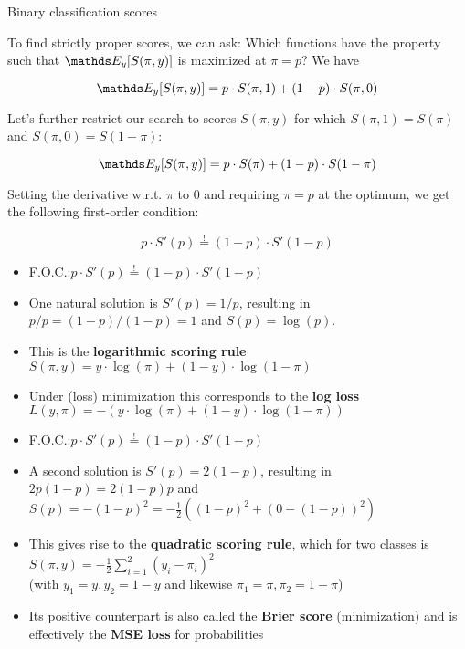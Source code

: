 \documentclass[11pt,compress,t,notes=noshow, xcolor=table]{beamer}
\begin{document}
\begin{vbframe}{Binary classification scores}

To find strictly proper scores, we can ask: Which functions have the property such that $\E_y[S(\pi,y)]$ is maximized at $\pi=p$? We have

$$\E_{y}[S(\pi, y)]=p \cdot S(\pi, 1) + (1-p) \cdot S(\pi, 0)$$

Let's further restrict our search to scores $S(\pi,y)$ for which $S(\pi,1)=S(\pi)$ and $S(\pi, 0)=S(1-\pi)$:

$$\E_{y}[S(\pi, y)]=p \cdot S(\pi) + (1-p) \cdot S(1-\pi)$$

\vspace{0.2cm}

Setting the derivative w.r.t. $\pi$ to $0$ and requiring $\pi=p$ at the optimum, we get the following first-order condition:

\vspace{0.3cm}

$$p \cdot S'(p) \overset{!}{=} (1-p) \cdot S'(1-p)$$

\framebreak

\begin{itemize}\setlength\itemsep{1.9em}
    \item F.O.C.:\quad $p \cdot S'(p) \overset{!}{=} (1-p) \cdot S'(1-p)$
    \item One natural solution is $S'(p)=1/p$, resulting in $p/p=(1-p)/(1-p)=1$ and $S(p)=\log(p)$. 
    \item This is the \textbf{logarithmic scoring rule} $S(\pi,y)=y \cdot \log(\pi) + (1-y) \cdot \log(1-\pi)$
    \item Under (loss) minimization this corresponds to the \textbf{log loss} $L(y,\pi)=-(y \cdot \log(\pi) + (1-y) \cdot \log(1-\pi))$
\end{itemize}

\framebreak

\begin{itemize} \setlength\itemsep{1.9em}
    \item F.O.C.:\quad $p \cdot S'(p) \overset{!}{=} (1-p) \cdot S'(1-p)$
    \item A second solution is $S'(p)=2(1-p)$, resulting in $2p(1-p)=2(1-p)p$ and $S(p)=-(1-p)^2=-\frac{1}{2}((1-p)^2+(0-(1-p))^2)$
    \item This gives rise to the \textbf{quadratic scoring rule}, which for two classes is $S(\pi,y)=-\frac{1}{2} \sum_{i=1}^{2}(y_i-\pi_i)^2$\\ {\small (with $y_1=y, y_2=1-y$ and likewise $\pi_1=\pi, \pi_2=1-\pi$)}
    \item Its positive counterpart is also called the \textbf{Brier score} (minimization) and is effectively the \textbf{MSE loss} for probabilities
\end{itemize}

\end{vbframe}



\endlecture
\end{document}
